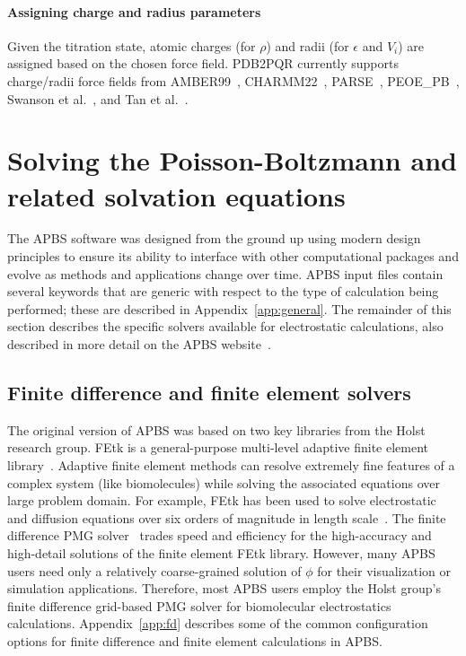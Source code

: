 \documentclass[12pt,titlepage]{article}
\begin{document}
\paragraph{Assigning charge and radius parameters} 
Given the tit\-rat\-ion state, atomic charges (for $\rho$) and radii (for $\epsilon$ and $V_i$) are assigned based on the chosen force field.
PDB2PQR currently supports charge/radii force fields from AMBER99~\cite{AMBER99}, CHARMM22~\cite{MacKerell2004}, PARSE~\cite{Sitkoff1994}, PEOE\_PB~\cite{Czodrowski2006}, Swanson et al.~\cite{Swanson2005a}, and Tan et al.~\cite{Tan2006}.

\section{Solving the Poisson-Boltzmann and related solvation equations} \label{sec:apbs}
The APBS software was designed from the ground up using modern design principles to ensure its ability to interface with other computational packages and evolve as methods and applications change over time.
APBS input files contain several keywords that are generic with respect to the type of calculation being performed; these are described in Appendix~\ref{app:general}.
The remainder of this section describes the specific solvers available for electrostatic calculations, also described in more detail on the APBS website~\cite{APBSweb}.

\subsection{Finite difference and finite element solvers} \label{sec:fd}
The original version of APBS was based on two key libraries from the Holst research group.
FEtk is a general-purpose multi-level adaptive finite element library~\cite{FEtk, FEtkweb}.
Adaptive finite element methods can resolve extremely fine features of a complex system (like biomolecules) while solving the associated equations over large problem domain.
For example, FEtk has been used to solve electrostatic and diffusion equations over six orders of magnitude in length scale~\cite{Tai2003}.
The finite difference PMG solver~\cite{FEtkweb, Holst1993} trades speed and efficiency for the high-accuracy and high-detail solutions of the finite element FEtk library.
However, many APBS users need only a relatively coarse-grained solution of $\phi$ for their visualization or simulation applications.
Therefore, most APBS users employ the Holst group's finite difference grid-based PMG solver for biomolecular electrostatics calculations.
Appendix~\ref{app:fd} describes some of the common configuration options for finite difference and finite element calculations in APBS.
\end{document}
